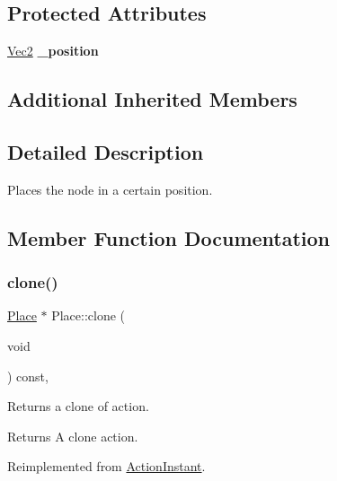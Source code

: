 \subsection*{Protected Attributes}
\begin{DoxyCompactItemize}
\item 
\mbox{\label{classPlace_a90230b547237c95f6f8b492d4671f1f9}} 
\hyperlink{classVec2}{Vec2} {\bfseries \+\_\+position}
\end{DoxyCompactItemize}
\subsection*{Additional Inherited Members}


\subsection{Detailed Description}
Places the node in a certain position. 

\subsection{Member Function Documentation}
\mbox{\label{classPlace_acd8513fc561c66d883d39703b6d5b0d9}} 
\subsubsection{\texorpdfstring{clone()}{clone()}\hspace{0.1cm}{\footnotesize\ttfamily [1/2]}}
{\footnotesize\ttfamily \hyperlink{classPlace}{Place} $\ast$ Place\+::clone (\begin{DoxyParamCaption}\item[{void}]{ }\end{DoxyParamCaption}) const\hspace{0.3cm}{\ttfamily [override]}, {\ttfamily [virtual]}}

Returns a clone of action.

\begin{DoxyReturn}{Returns}
A clone action. 
\end{DoxyReturn}


Reimplemented from \hyperlink{classActionInstant_adb76fc6f006098109e8256210cbd8cc0}{Action\+Instant}.

\mbox{\label{classPlace_a9207d39fa23c9cfbc2bb79127c611af8}} 
